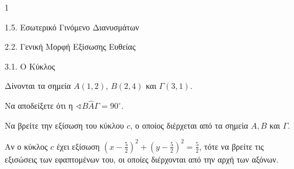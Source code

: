\begin{ylh}{1}
    \item 1.5. Εσωτερικό Γινόμενο Διανυσμάτων
    \item 2.2. Γενική Μορφή Εξίσωσης Ευθείας
    \item 3.1. Ο Κύκλος
\end{ylh}
Δίνονται τα σημεία $A(1,2)$, $B(2,4)$ και $\Gamma(3,1)$.
\begin{alist}
\item Να αποδείξετε ότι η $\sphericalangle B\hat{A}\Gamma = 90^\circ$. 
\item Να βρείτε την εξίσωση του κύκλου $c$, ο οποίος διέρχεται από τα σημεία $A, B$ και $\Gamma$. 
\item Αν ο κύκλος $c$ έχει εξίσωση $\left(x - \frac{5}{2}\right)^2 + \left(y - \frac{5}{2}\right)^2 = \frac{5}{2}$, τότε να βρείτε τις εξισώσεις των εφαπτομένων του, οι οποίες διέρχονται από την αρχή των αξόνων. 
\end{alist}